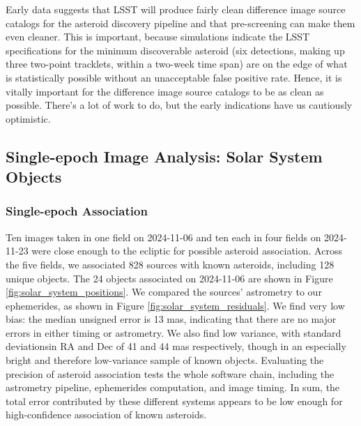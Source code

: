 Early data suggests that LSST will produce fairly clean difference image source catalogs for the asteroid discovery pipeline and that pre-screening can make them even cleaner. This is important, because simulations indicate the LSST specifications for the minimum discoverable asteroid (six detections, making up three two-point tracklets, within a two-week time span) are on the edge of what is statistically possible without an unacceptable false positive rate. Hence, it is vitally important for the difference image source catalogs to be as clean as possible. There's a lot of work to do, but the early indications have us cautiously optimistic.

\subsection{Single-epoch Image Analysis: Solar System Objects}
\label{sec:sia_solar_system}

\subsubsection{Single-epoch Association}
\label{sec:association}


Ten images taken in one field on 2024-11-06 and ten each in four fields on 2024-11-23 were close enough to the ecliptic for possible asteroid association. Across the five fields, we associated 828 sources with known asteroids, including 128 unique objects. The 24 objects associated on 2024-11-06 are shown in Figure \ref{fig:solar_system_positions}. We compared the sources' astrometry to our ephemerides, as shown in Figure \ref{fig:solar_system_residuals}. We find very low bias: the median unsigned error is 13 mas, indicating that there are no major errors in either timing or astrometry. We also find low variance, with standard deviationsin RA and Dec of 41 and 44 mas respectively, though in an especially bright and therefore low-variance sample of known objects. Evaluating the precision of asteroid association tests the whole software chain, including the astrometry pipeline, ephemerides computation, and image timing. In sum, the total error contributed by these different systems appears to be low enough for high-confidence association of known asteroids.

